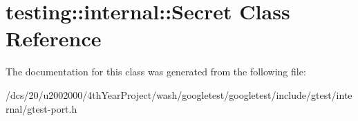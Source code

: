 \hypertarget{classtesting_1_1internal_1_1Secret}{}\section{testing\+:\+:internal\+:\+:Secret Class Reference}
\label{classtesting_1_1internal_1_1Secret}


The documentation for this class was generated from the following file\+:\begin{DoxyCompactItemize}
\item 
/dcs/20/u2002000/4th\+Year\+Project/wash/googletest/googletest/include/gtest/internal/gtest-\/port.\+h\end{DoxyCompactItemize}
